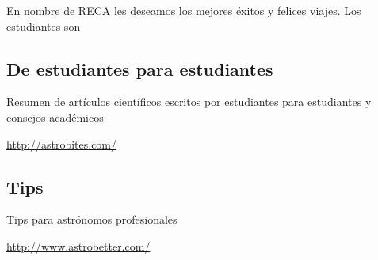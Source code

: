 \documentclass{book}
\begin{document}
 En nombre de RECA les deseamos los mejores éxitos y felices viajes. Los estudiantes son
 \subsection{De estudiantes para estudiantes}
 Resumen de artículos científicos escritos por estudiantes para estudiantes
y consejos académicos
\begin{center}
\url{http://astrobites.com/}
\end{center}
\subsection{Tips}
Tips para astrónomos profesionales
\begin{center}
\url{http://www.astrobetter.com/ }
\end{center}

\end{document}
